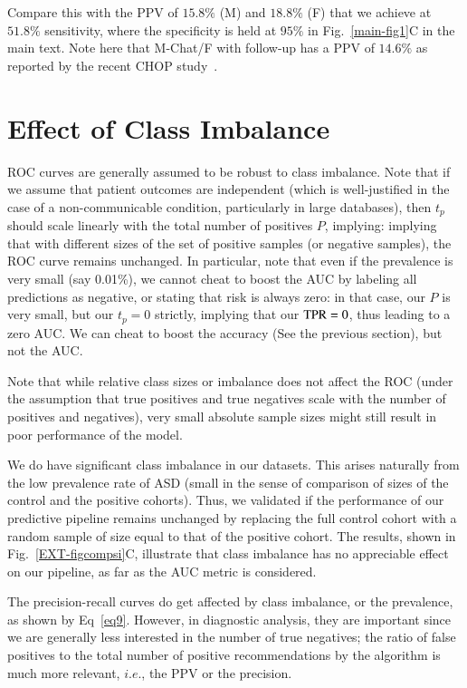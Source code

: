 \documentclass[onecolumn,,10pt]{IEEEtran}
\gdef\treatment{positive\xspace}
\begin{document}
Compare this with the PPV of $15.8 \%$ (M) and $18.8 \%$ (F) that we achieve at $51.8\%$ sensitivity, where the specificity is held at $95\%$ in Fig.~\ref{main-fig1}C in the main text. Note here that M-Chat/F with follow-up has a PPV of $14.6\%$ as reported by the recent CHOP study~\cite{pmid31562252}.
%


\section{Effect of Class Imbalance}\label{subsec:classimbalance}
ROC curves are generally assumed to be robust to
class imbalance.
Note that if we assume that patient outcomes are independent (which is well-justified in  the case of a non-communicable condition, particularly in large
databases), then $t_p$ should scale linearly with the total number of positives $P$, implying:
%
  implying that with different sizes of the set of positive samples (or negative samples), the ROC curve remains unchanged. In particular, note that even if the prevalence is very small (say 0.01\%), we cannot cheat to boost the AUC by labeling all predictions as negative, or stating that risk is always zero: in that case, our $P$ is very small, but our $t_p=0$ strictly, implying that our $\textrm{TPR}=0$, thus leading to a zero AUC. We can cheat to boost the accuracy (See the previous section), but not the AUC.


  Note that while relative class sizes or imbalance does not affect the ROC (under the assumption that true positives and true negatives scale with the number of positives and negatives), very small absolute sample sizes might still
  result in poor performance of the model.

We do have significant class imbalance in our datasets. This arises naturally from the low prevalence rate of ASD (small in the sense of comparison of sizes of the control and the \treatment  cohorts). Thus, we validated if the performance of our predictive pipeline remains unchanged by replacing  the full control cohort with a random sample of size equal to that of the \treatment cohort. The results, shown in Fig.~\ref{EXT-figcompsi}C, illustrate that class imbalance has no appreciable effect on our pipeline, as far as the AUC metric is considered.

 The precision-recall curves do get affected by class imbalance, or the prevalence, as shown by Eq~\eqref{eq9}. 
 However, in diagnostic analysis, they are important since we are generally less interested in the number of true negatives; the ratio of false positives to the total number of positive recommendations by the algorithm is much more relevant, $i.e.$, the PPV or the precision.
\end{document}
